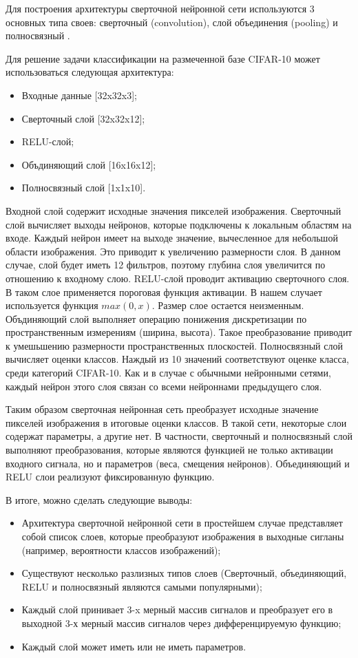 \documentclass[a4paper,english,russian]{G2-105}
\begin{document}
\par Для построения архитектуры сверточной нейронной сети используются 3 основных типа своев: сверточный (convolution), слой объединения (pooling) и полносвязный \cite{15}. 
\par Для решение задачи классификации на размеченной базе CIFAR-10 может использоваться следующая архитектура:
\begin{itemize}
\item Входные данные [32x32x3]; 
\item Сверточный слой [32x32x12]; 
\item RELU-слой;
\item Объдиняющий слой [16x16x12];
\item Полносвязный слой [1x1x10].
\end{itemize}
\par Входной слой содержит исходные значения пикселей изображения. Сверточный слой вычисляет выходы нейронов, которые подключены к локальным областям на входе. Каждый нейрон имеет на выходе значение, вычесленное для небольшой области изображения. Это приводит к увеличению размерности слоя. В данном случае, слой будет иметь 12 фильтров, поэтому глубина слоя увеличится по отношению к входному слою. RELU-слой проводит активацию сверточного слоя. В таком слое применяется пороговая функция активации. В нашем случает используется функция $max(0, x)$. Размер слое остается неизменным. Объдиняющий слой выполняет операцию понижения дискретизации по пространственным измерениям (ширина, высота). Такое преобразование приводит к умешьшению размерности пространственных плоскостей. Полносвязный слой вычисляет оценки классов. Наждый из 10 значений соответствуют оценке класса, среди категорий CIFAR-10. Как и в случае с обычными нейронными сетями, каждый нейрон этого слоя связан со всеми нейроннами предыдущего слоя.
\par Таким образом сверточная нейронная сеть преобразует исходные значение пикселей изображения в итоговые оценки классов. В такой сети, некоторые слои содержат параметры, а другие нет. В частности, сверточный и полносвязный слой выполняют преобразования, которые являются функцией не только активации входного сигнала, но и параметров (веса, смещения нейронов). Объединяющий и RELU слои реализуют фиксированную функцию. 
\par В итоге, можно сделать следующие выводы:
\begin{itemize}
\item Архитектура сверточной нейронной сети в простейшем случае представляет собой список слоев, которые преобразуют изображения в выходные сигланы (например, вероятности классов изображений);
\item Существуют несколько разлизных типов слоев (Сверточный, объединяющий, RELU и полносвязный являются самыми популярными);
\item Каждый слой принивает 3-x мерный массив сигналов и преобразует его в выходной 3-х мерный массив сигналов через дифференцируемую функцию;
\item Каждый слой может иметь или не иметь параметров.
\end{itemize}
\end{document}
